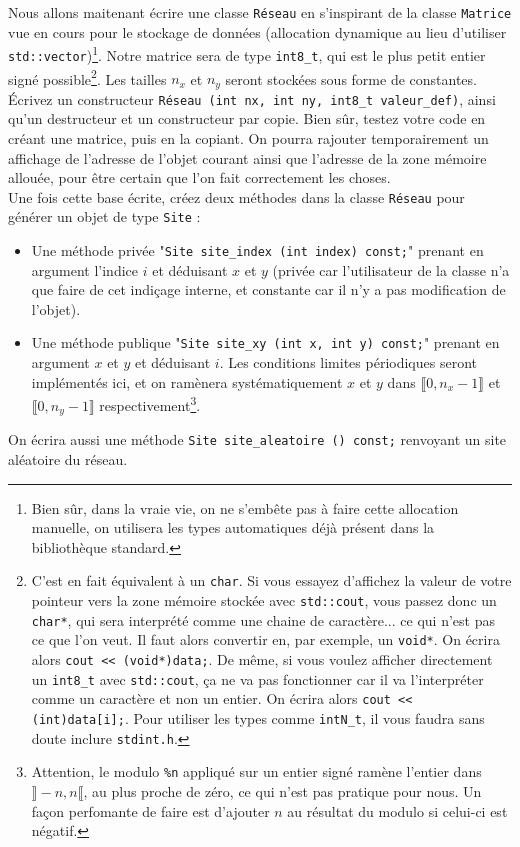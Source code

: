 \documentclass{book}
\newcommand{\inline}[1]{\texttt{#1}}
\begin{document}
Nous allons maitenant écrire une classe \inline{Réseau} en s'inspirant de la classe \inline{Matrice} vue en cours pour le stockage de données (allocation dynamique au lieu d'utiliser \inline{std::vector})\footnote{Bien sûr, dans la vraie vie, on ne s'embête pas à faire cette allocation manuelle, on utilisera les types automatiques déjà présent dans la bibliothèque standard.}. Notre matrice sera de type \inline{int8_t}, qui est le plus petit entier signé possible\footnote{C'est en fait équivalent à un \inline{char}. Si vous essayez d'affichez la valeur de votre pointeur vers la zone mémoire stockée avec \inline{std::cout}, vous passez donc un \inline{char*}, qui sera interprété comme une chaine de caractère... ce qui n'est pas ce que l'on veut. Il faut alors convertir en, par exemple, un \inline{void*}. On écrira alors \inline{cout << (void*)data;}. De même, si vous voulez afficher directement un \inline{int8_t} avec \inline{std::cout}, ça ne va pas fonctionner car il va l'interpréter comme un caractère et non un entier. On écrira alors \inline{cout << (int)data[i];}. Pour utiliser les types comme \inline{intN_t}, il vous faudra sans doute inclure \inline{stdint.h}.}. Les tailles $n_x$ et $n_y$ seront stockées sous forme de constantes. Écrivez un constructeur \inline{Réseau (int nx, int ny, int8_t valeur_def)}, ainsi qu'un destructeur et un constructeur par copie. Bien sûr, testez votre code en créant une matrice, puis en la copiant. On pourra rajouter temporairement un affichage de l'adresse de l'objet courant ainsi que l'adresse de la zone mémoire allouée, pour être certain que l'on fait correctement les choses.\\

Une fois cette base écrite, créez deux méthodes dans la classe \inline{Réseau} pour générer un objet de type \inline{Site} :
\begin{itemize}
  \item Une méthode privée "\inline{Site site_index (int index) const;}" prenant en argument l'indice $i$ et déduisant $x$ et $y$ (privée car l'utilisateur de la classe n'a que faire de cet indiçage interne, et constante car il n'y a pas modification de l'objet).
  \item Une méthode publique "\inline{Site site_xy (int x, int y) const;}" prenant en argument $x$ et $y$ et déduisant $i$. Les conditions limites périodiques seront implémentés ici, et on ramènera systématiquement $x$ et $y$ dans $\llbracket 0,n_x\!-\!1 \rrbracket$ et $\llbracket 0,n_y\!-\!1\rrbracket$ respectivement\footnote{Attention, le modulo \texttt{\%n} appliqué sur un entier signé ramène l'entier dans $\rrbracket-n,n\llbracket$, au plus proche de zéro, ce qui n'est pas pratique pour nous. Un façon perfomante de faire est d'ajouter $n$ au résultat du modulo si celui-ci est négatif.}.
\end{itemize}
On écrira aussi une méthode \inline{Site site_aleatoire () const;} renvoyant un site aléatoire du réseau.\\
\end{document}
